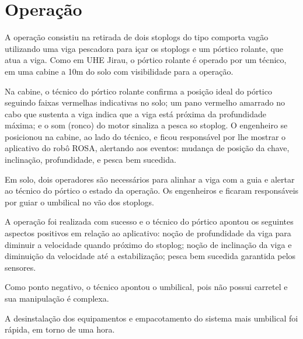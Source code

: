 \section{Operação}

A operação consistiu na retirada de dois stoplogs do tipo comporta vagão
utilizando uma viga pescadora para içar os stoplogs e um pórtico rolante, que
atua a viga. Como em UHE Jirau, o pórtico rolante é operado por um técnico, em
uma cabine a 10m do solo com visibilidade para a operação. 

Na cabine, o técnico do pórtico rolante confirma a posição
ideal do pórtico seguindo faixas vermelhas indicativas no solo; um
pano vermelho amarrado no cabo que sustenta a viga indica que a viga está
próxima da profundidade máxima; e o som (ronco) do motor sinaliza a pesca so
stoplog. O engenheiro \renan se posicionou na cabine, ao lado do técnico, e
ficou responsável por lhe mostrar o aplicativo do robô ROSA,
alertando aos eventos: mudança de posição da chave, inclinação, profundidade, e
pesca bem sucedida.

Em solo, dois operadores são necessários para alinhar a viga com a guia e
alertar ao técnico do pórtico o estado da operação. Os engenheiros \estevao e
\sylvain ficaram responsáveis por guiar o umbilical no vão dos stoplogs.

A operação foi realizada com sucesso e o técnico do pórtico apontou os seguintes
aspectos positivos em relação ao aplicativo: noção de profundidade da viga para diminuir
a velocidade quando próximo do stoplog; noção de inclinação da viga e
diminuição da velocidade até a estabilização; pesca bem sucedida garantida pelos
sensores.

Como ponto negativo, o técnico apontou o umbilical, pois não possui carretel e
sua manipulação é complexa.

A desinstalação dos equipamentos e empacotamento do sistema mais umbilical foi
rápida, em torno de uma hora.
